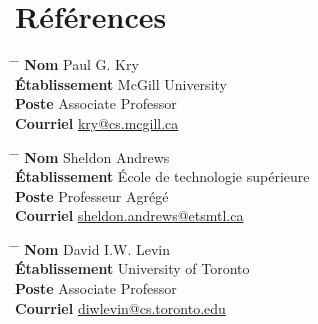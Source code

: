 \documentclass[10pt]{article} %
\begin{document}
\section{Références}

\parbox{0.5\textwidth}{
\begin{tabbing}
\hspace{2.75cm} \= \hspace{4cm} \= \kill
{\bf Nom} \> Paul G. Kry\\ 
{\bf Établissement} \> McGill University\\ 
{\bf Poste} \> Associate Professor \\ 
{\bf Courriel} \> \href{mailto:kry@cs.mcgill.ca}{kry@cs.mcgill.ca}
\end{tabbing}}

\noindent\parbox{0.5\textwidth}{
\begin{tabbing}
\hspace{2.75cm} \= \hspace{4cm} \= \kill
{\bf Nom} \> Sheldon Andrews\\ 
{\bf Établissement} \> École de technologie supérieure\\ 
{\bf Poste} \>  Professeur Agrégé \\ 
{\bf Courriel} \> \href{mailto:sheldon.andrews@etsmtl.ca}{sheldon.andrews@etsmtl.ca}
\end{tabbing}}

\noindent\parbox{0.5\textwidth}{
\begin{tabbing}
\hspace{2.75cm} \= \hspace{4cm} \= \kill
{\bf Nom} \> David I.W. Levin\\ 
{\bf Établissement} \> University of Toronto\\ 
{\bf Poste} \>Associate Professor \\ 
{\bf Courriel} \> \href{mailto:diwlevin@cs.toronto.edu}{diwlevin@cs.toronto.edu}
\end{tabbing}}


\end{document}
